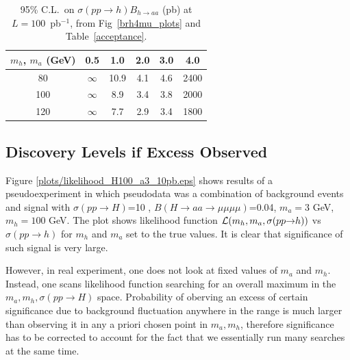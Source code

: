 \documentclass[aps,prd,onecolumn,superscriptaddress,showpacs]{revtex4}
\begin{document}
\begin{table}[htb]
\caption{95\% C.L.\ on $\sigma(pp \to h) B_{h \to aa}$ (pb) at $L = 100$~pb$^{-1}$, from Fig~\ref{brh4mu_plots} and Table~\ref{acceptance}. \label{table_both_factorized}}
\begin{center}
\renewcommand{\arraystretch}{1.3}
\begin{tabular}{| c | c | c | c | c | c |}
\hline
\mbox{\hspace{0.25 cm}}$m_h$, $m_a$ (GeV)\mbox{\hspace{0.25 cm}} & \mbox{\hspace{0.25 cm}}0.5\mbox{\hspace{0.25 cm}} & \mbox{\hspace{0.25 cm}}1.0\mbox{\hspace{0.25 cm}} & \mbox{\hspace{0.25 cm}}2.0\mbox{\hspace{0.25 cm}} & \mbox{\hspace{0.25 cm}}3.0\mbox{\hspace{0.25 cm}} & \mbox{\hspace{0.25 cm}}4.0\mbox{\hspace{0.25 cm}} \\\hline
80 & $\infty$ & 10.9 & 4.1 & 4.6 & 2400 \\\hline
100 & $\infty$ & 8.9 & 3.4 & 3.8 & 2000 \\\hline
120 & $\infty$ & 7.7 & 2.9 & 3.4 & 1800 \\\hline
\end{tabular}
\end{center}
\end{table}

\subsection{Discovery Levels if Excess Observed}

Figure \ref{plots/likelihood_H100_a3_10pb.eps} shows results of a pseudoexperiment in which pseudodata was a combination 
of background events and signal with $\sigma (pp \to H)$=10 \ipb, $B(H \to aa \to \mu \mu \mu \mu)$=0.04, $m_a=3$ GeV, 
$m_h= 100$ GeV. The plot shows likelihood function ${\cal L}(m_h, m_a, \sigma(pp \to h))$ vs $\sigma(pp \to h)$ for 
$m_h$ and $m_a$ set to the true values. It is clear that significance of such signal is very large.

However, in real experiment, one does not look at fixed values of $m_a$ and $m_h$. Instead, one scans likelihood function
searching for an overall maximum in the $m_a,m_h,\sigma (pp \to H)$ space. Probability of oberving an excess of certain 
significance due to background fluctuation anywhere in the range is much larger than observing it in any a priori chosen 
point in $m_a,m_h$, therefore significance has to be corrected to account for the fact that we essentially run many searches 
at the same time. 
\end{document}
